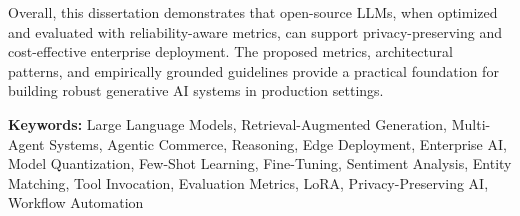 \begin{singlespace}
Overall, this dissertation demonstrates that open-source LLMs, when optimized and evaluated with reliability-aware metrics, can support privacy-preserving and cost-effective enterprise deployment. The proposed metrics, architectural patterns, and empirically grounded guidelines provide a practical foundation for building robust generative AI systems in production settings.

\vspace{0.8em}
\noindent\textbf{Keywords:} Large Language Models, Retrieval-Augmented Generation, Multi-Agent Systems, Agentic Commerce, Reasoning, Edge Deployment, Enterprise AI, Model Quantization, Few-Shot Learning, Fine-Tuning, Sentiment Analysis, Entity Matching, Tool Invocation, Evaluation Metrics, LoRA, Privacy-Preserving AI, Workflow Automation

\end{singlespace}